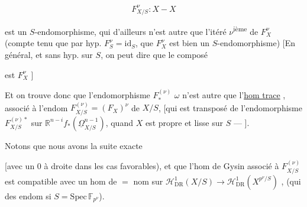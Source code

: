 \[
F^\nu_{X/S}:X\mathbin{-}X
\]

est un $S$-endomorphisme, qui d'ailleurs n'est autre que l'itéré $\nu$\textsuperscript{ième} de $F_X^\nu$ (compte tenu que par hyp. $F_S^\nu=\mathrm{id}_S$,  que $F_X^\nu$ est bien un $S$-endomorphisme) [En général, et sans hyp. sur $S$, on peut dire que le composé


est $F_X^\nu$ ]




Et on trouve donc que l'endomorphisme $F_*^{(\nu)}$  $\omega$ n'est autre que l'\uline{hom trace} , associé à l'endom $F_{X/S}^{(\nu)}=(F_X)^\nu$ de $X/S$, [qui est transposé de l'endomorphisme $F_{X/S}^{(\nu)*}$ sur $\mathbb R^{n-i}f_*(\underline\Omega^{n-1}_{X/S})$, quand $X$ est propre et lisse sur $S$ --- ].

 Notons que nous avons la suite exacte


[avec un $0$ à droite dans les cas favorables), et que l'hom de Gysin  associé à $F_{X/S}^{(\nu)}$ est compatible avec un hom de $=$ nom sur $\mathcal H^1_{\mathrm{DR}}(X/S)\longrightarrow\mathcal H^1_{\mathrm{DR}}(X^{p^\nu/S})$ , (qui  des endom si $S=\mathrm{Spec}\,\mathbb F_{p^\nu}$). 

